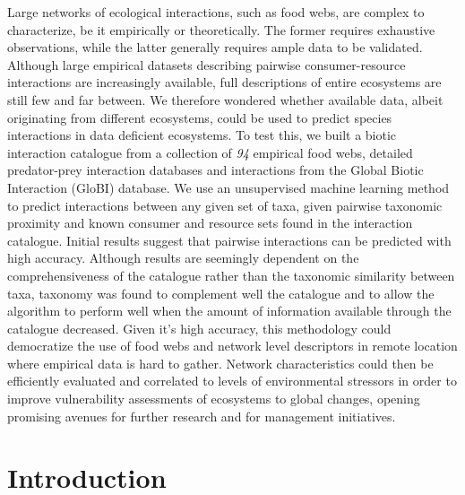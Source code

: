\documentclass[letterpaper]{article}
\begin{document}
Large networks of ecological interactions, such as food webs, are complex to characterize, be it empirically or theoretically. The former requires exhaustive observations, while the latter generally requires ample data to be validated. Although large empirical datasets describing pairwise consumer-resource interactions are increasingly available, full descriptions of entire ecosystems are still few and far between. We therefore wondered whether available data, albeit originating from different ecosystems, could be used to predict species interactions in data deficient ecosystems. To test this, we built a biotic interaction catalogue from a collection of \textit{94} empirical food webs, detailed predator-prey interaction databases and interactions from the Global Biotic Interaction (GloBI) database. We use an unsupervised machine learning method to predict interactions between any given set of taxa, given pairwise taxonomic proximity and known consumer and resource sets found in the interaction catalogue. Initial results suggest that pairwise interactions can be predicted with high accuracy. Although results are seemingly dependent on the comprehensiveness of the catalogue rather than the taxonomic similarity between taxa, taxonomy was found to complement well the catalogue and to allow the algorithm to perform well when the amount of information available through the catalogue decreased. Given it’s high accuracy, this methodology could democratize the use of food webs and network level descriptors in remote location where empirical data is hard to gather. Network characteristics could then be efficiently evaluated and correlated to levels of environmental stressors in order to improve vulnerability assessments of ecosystems to global changes, opening promising avenues for further research and for management initiatives.

\section{Introduction}

%
%
%
%
%
\end{document}
